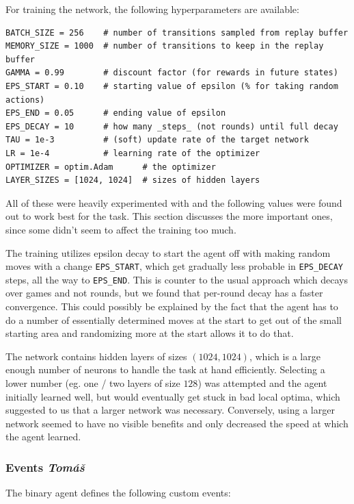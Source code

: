 \documentclass{article}
\begin{document}
For training the network, the following hyperparameters are available:

\begin{verbatim}
BATCH_SIZE = 256    # number of transitions sampled from replay buffer
MEMORY_SIZE = 1000  # number of transitions to keep in the replay buffer
GAMMA = 0.99        # discount factor (for rewards in future states)
EPS_START = 0.10    # starting value of epsilon (% for taking random actions)
EPS_END = 0.05      # ending value of epsilon
EPS_DECAY = 10      # how many _steps_ (not rounds) until full decay
TAU = 1e-3          # (soft) update rate of the target network
LR = 1e-4           # learning rate of the optimizer
OPTIMIZER = optim.Adam      # the optimizer
LAYER_SIZES = [1024, 1024]  # sizes of hidden layers
\end{verbatim}

All of these were heavily experimented with and the following values were found out to work best for the task.
This section discusses the more important ones, since some didn't seem to affect the training too much.

The training utilizes epsilon decay to start the agent off with making random moves with a change \texttt{EPS\_START}, which get gradually less probable in \texttt{EPS\_DECAY} steps, all the way to \texttt{EPS\_END}.
This is counter to the usual approach which decays over games and not rounds, but we found that per-round decay has a faster convergence.
This could possibly be explained by the fact that the agent has to do a number of essentially determined moves at the start to get out of the small starting area and randomizing more at the start allows it to do that.

The network contains hidden layers of sizes $(1024, 1024)$, which is a large enough number of neurons to handle the task at hand efficiently.
Selecting a lower number (eg. one / two layers of size $128$) was attempted and the agent initially learned well, but would eventually get stuck in bad local optima, which suggested to us that a larger network was necessary.
Conversely, using a larger network seemed to have no visible benefits and only decreased the speed at which the agent learned.

\subsubsection[Events]{Events {\normalsize \normalfont \it \hfill Tomáš}}

The binary agent defines the following custom events:
\end{document}
